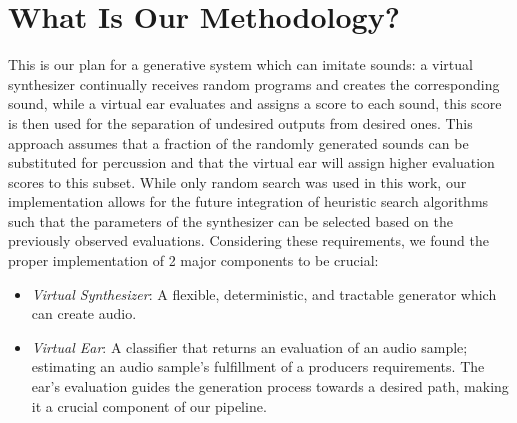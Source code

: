 \documentclass[\main/thesis.tex]{subfiles}
\begin{document}

\section{What Is Our Methodology?}
\label{sec_methodology}
This is our plan for a generative system which can imitate sounds: a virtual synthesizer continually receives random programs and creates the corresponding sound, while a virtual ear evaluates and assigns a score to each sound, this score is then used for the separation of undesired outputs from desired ones. This approach assumes that a fraction of the randomly generated sounds can be substituted for percussion and that the virtual ear will assign higher evaluation scores to this subset. While only random search was used in this work, our implementation allows for the future integration of heuristic search algorithms such that the parameters of the synthesizer can be selected based on the previously observed evaluations. Considering these requirements, we found the proper implementation of 2 major components to be crucial:

\begin{itemize}
    \item \textit{Virtual Synthesizer}: A flexible, deter\-min\-istic, and tract\-able gener\-ator which can create audio. 
    \item \textit{Virtual Ear}: A classifier that returns an evaluation of an audio sample; estimating an audio sample's fulfillment of a producers requirements. The ear's evaluation guides the generation process towards a desired path, making it a crucial component of our pipeline. 
\end{itemize}
\end{document}
